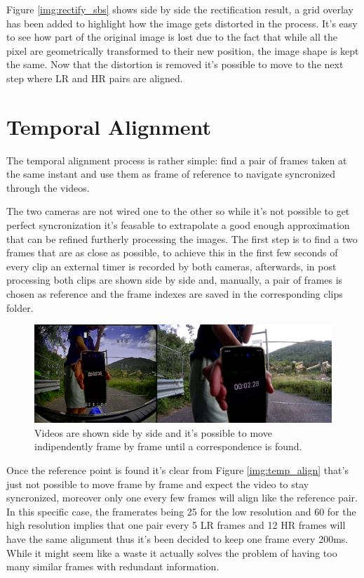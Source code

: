 Figure \ref{img:rectify_sbs} shows side by side the rectification result, a grid overlay has been added to highlight how the image gets distorted in the process. It's easy to see how part of the original image is lost due to the fact that while all the pixel are geometrically transformed to their new position, the image shape is kept the same. Now that the distortion is removed it's possible to move to the next step where LR and HR pairs are aligned.

\section{Temporal Alignment}
\label{sec:temp_align}

The temporal alignment process is rather simple: find a pair of frames taken at the same instant and use them as frame of reference to navigate syncronized through the videos.

The two cameras are not wired one to the other so while it's not possible to get perfect syncronization it's feasable to extrapolate a good enough approximation that can be refined furtherly processing the images. The first step is to find a two frames that are as close as possible, to achieve this in the first few seconds of every clip an external timer is recorded by both cameras, afterwards, in post processing both clips are shown side by side and, manually, a pair of frames is chosen as reference and the frame indexes are saved in the corresponding clips folder.

\begin{figure}[H]
  \centering
  \includegraphics[scale=0.4]{figures/time_sync.png}
  \caption{Videos are shown side by side and it's possible to move indipendently frame by frame until a correspondence is found.}
  \label{img:time_sync}
\end{figure}

Once the reference point is found it's clear from Figure \ref{img:temp_align} that's just not possible to move frame by frame and expect the video to stay syncronized, moreover only one every few frames will align like the reference pair. In this specific case, the framerates being 25 for the low resolution and 60 for the high resolution implies that one pair every 5 LR frames and 12 HR frames will have the same alignment thus it's been decided to keep one frame every 200ms. While it might seem like a waste it actually solves the problem of having too many similar frames with redundant information.


